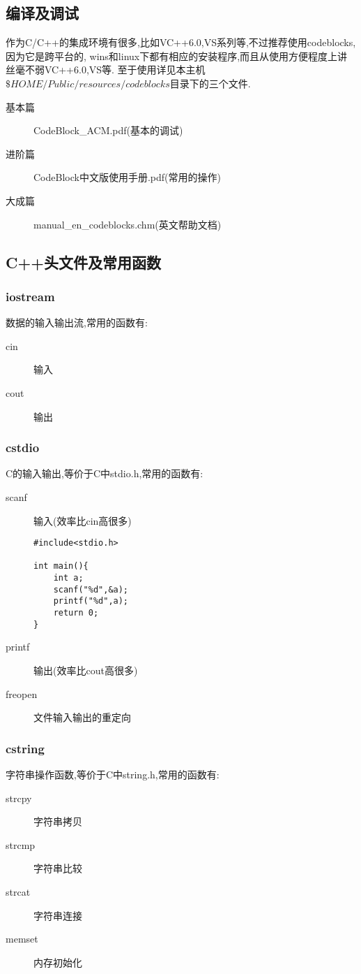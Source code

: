 \subsection{编译及调试}
作为C/C++的集成环境有很多,比如VC++6.0,VS系列等,不过推荐使用codeblocks,因为它是跨平台的,
wins和linux下都有相应的安装程序,而且从使用方便程度上讲丝毫不弱VC++6.0,VS等.
至于使用详见本主机$\$HOME/Public/resources/codeblocks$目录下的三个文件.
\begin{description}
\item[基本篇]		CodeBlock\_{}ACM.pdf(基本的调试)
\item[进阶篇] 	CodeBlock中文版使用手册.pdf(常用的操作)
\item[大成篇]		manual\_{}en\_{}codeblocks.chm(英文帮助文档) 
\end{description}


\subsection{C++头文件及常用函数}
\subsubsection{iostream}
数据的输入输出流,常用的函数有:
\begin{description}
\item[cin]	输入
\item[cout]	输出
\end{description}


\subsubsection{cstdio}
C的输入输出,等价于C中stdio.h,常用的函数有:
\begin{description}
\item[scanf]		输入(效率比cin高很多)	
\begin{lstlisting}[style=C]
#include<stdio.h>

int main(){
	int a;
	scanf("%d",&a);
	printf("%d",a);	
	return 0;
}
\end{lstlisting}
\item[printf]	输出(效率比cout高很多)
\item[freopen]	文件输入输出的重定向
\end{description}


\subsubsection{cstring}
字符串操作函数,等价于C中string.h,常用的函数有:
\begin{description}
\item[strcpy]	字符串拷贝
\item[strcmp]	字符串比较
\item[strcat]	字符串连接
\item[memset]	内存初始化
\end{description}


